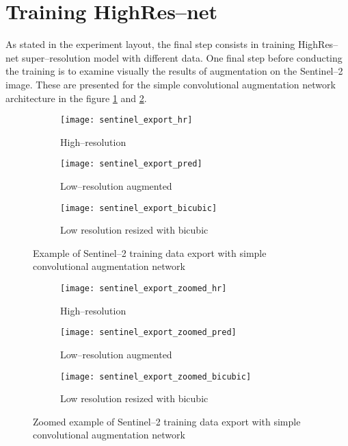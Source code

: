 \section{Training HighRes--net}
As stated in the experiment layout, the final step consists in training HighRes--net super--resolution model with different data.
One final step before conducting the training is to examine visually the results of augmentation on the Sentinel--2 image.
These are presented for the simple convolutional augmentation network architecture in the figure \ref{fig:export-example} and \ref{fig:export-example-zoomed}.
\begin{figure}
    \begin{subfigure}[t]{0.3\textwidth}
        \centering
        \texttt{[image: sentinel\_export\_hr]}
        \caption{High--resolution}
    \end{subfigure}
    \hfill
    \begin{subfigure}[t]{0.3\textwidth}
        \centering
        \texttt{[image: sentinel\_export\_pred]}
        \caption{Low--resolution augmented}
    \end{subfigure}
    \hfill
    \begin{subfigure}[t]{0.3\textwidth}
        \centering
        \texttt{[image: sentinel\_export\_bicubic]}
        \caption{Low resolution resized with bicubic}
    \end{subfigure}
    \caption{Example of Sentinel--2 training data export with simple convolutional augmentation network}
    \label{fig:export-example}
\end{figure}
\begin{figure}
    \begin{subfigure}[t]{0.3\textwidth}
        \centering
        \texttt{[image: sentinel\_export\_zoomed\_hr]}
        \caption{High--resolution}
    \end{subfigure}
    \hfill
    \begin{subfigure}[t]{0.3\textwidth}
        \centering
        \texttt{[image: sentinel\_export\_zoomed\_pred]}
        \caption{Low--resolution augmented}
    \end{subfigure}
    \hfill
    \begin{subfigure}[t]{0.3\textwidth}
        \centering
        \texttt{[image: sentinel\_export\_zoomed\_bicubic]}
        \caption{Low resolution resized with bicubic}
    \end{subfigure}
    \caption{Zoomed example of Sentinel--2 training data export with simple convolutional augmentation network}
    \label{fig:export-example-zoomed}
\end{figure}

